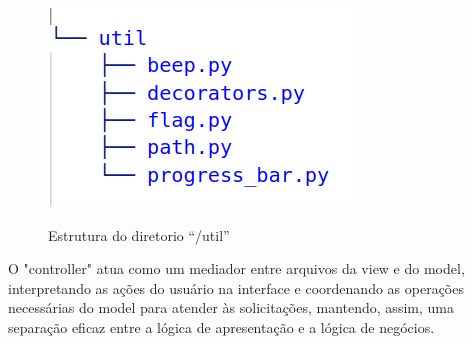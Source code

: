 \begin{figure}[H]
	\centering
    \caption{Estrutura do diretorio ``/util''}
	\includegraphics[scale=0.5]{figuras/diretorios/util.png}
	\label{fig:util}
\end{figure}



O "controller" atua como um mediador entre arquivos da view e do model, interpretando as ações do usuário na interface e coordenando as operações necessárias do model para atender às solicitações, mantendo, assim, uma separação eficaz entre a lógica de apresentação e a lógica de negócios.

